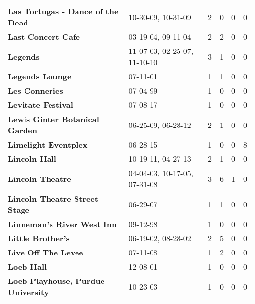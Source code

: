 \begin{supertabular}{llllll}
                            \textbf{Las Tortugas - Dance of the Dead} &            10-30-09, 10-31-09 &  2 &   0 &  0 &  0 \\
                                           \textbf{Last Concert Cafe} &            03-19-04, 09-11-04 &  2 &   2 &  0 &  0 \\
                                                     \textbf{Legends} &  11-07-03, 02-25-07, 11-10-10 &  3 &   1 &  0 &  0 \\
                                              \textbf{Legends Lounge} &                      07-11-01 &  1 &   1 &  0 &  0 \\
                                               \textbf{Les Conneries} &                      07-04-99 &  1 &   0 &  0 &  0 \\
                                           \textbf{Levitate Festival} &                      07-08-17 &  1 &   0 &  0 &  0 \\
                               \textbf{Lewis Ginter Botanical Garden} &            06-25-09, 06-28-12 &  2 &   1 &  0 &  0 \\
                                         \textbf{Limelight Eventplex} &                      06-28-15 &  1 &   0 &  0 &  8 \\
                                                \textbf{Lincoln Hall} &            10-19-11, 04-27-13 &  2 &   1 &  0 &  0 \\
                                             \textbf{Lincoln Theatre} &  04-04-03, 10-17-05, 07-31-08 &  3 &   6 &  1 &  0 \\
                                \textbf{Lincoln Theatre Street Stage} &                      06-29-07 &  1 &   1 &  0 &  0 \\
                                   \textbf{Linneman's River West Inn} &                      09-12-98 &  1 &   0 &  0 &  0 \\
                                            \textbf{Little Brother's} &            06-19-02, 08-28-02 &  2 &   5 &  0 &  0 \\
                                          \textbf{Live Off The Levee} &                      07-11-08 &  1 &   2 &  0 &  0 \\
                                                   \textbf{Loeb Hall} &                      12-08-01 &  1 &   0 &  0 &  0 \\
                           \textbf{Loeb Playhouse, Purdue University} &                      10-23-03 &  1 &   0 &  0 &  0 \\

\end{supertabular}
